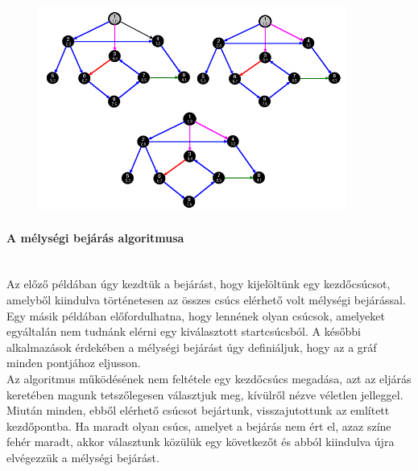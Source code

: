 \documentclass[margin=0px]{article}
\begin{document}
	\begin{figure}[H]
		\centering
		\includegraphics[width=0.9\textwidth]{img/melysegi_4.png}
		\label{fig:melysegi_pelda_4}
	\end{figure}



    \paragraph*{A mélységi bejárás algoritmusa\\\\}

    \noindent Az előző példában úgy kezdtük a bejárást, hogy kijelöltünk egy kezdőcsúcsot, amelyből kiindulva történetesen az összes csúcs elérhető volt mélységi bejárással. Egy másik példában előfordulhatna, hogy lennének olyan csúcsok, amelyeket egyáltalán nem tudnánk elérni egy kiválasztott startcsúcsból. A későbbi alkalmazások érdekében a mélységi bejárást úgy definiáljuk, hogy az a gráf minden pontjához eljusson.\\

    \noindent Az algoritmus működésének nem feltétele egy kezdőcsúcs megadása, azt az eljárás keretében magunk tetszőlegesen választjuk meg, kívülről nézve véletlen jelleggel. Miután minden, ebből elérhető csúcsot bejártunk, visszajutottunk az említett kezdőpontba. Ha maradt olyan csúcs, amelyet a bejárás nem ért el, azaz színe fehér maradt, akkor választunk közülük egy következőt és abból kiindulva újra elvégezzük a mélységi bejárást.\\
\end{document}
